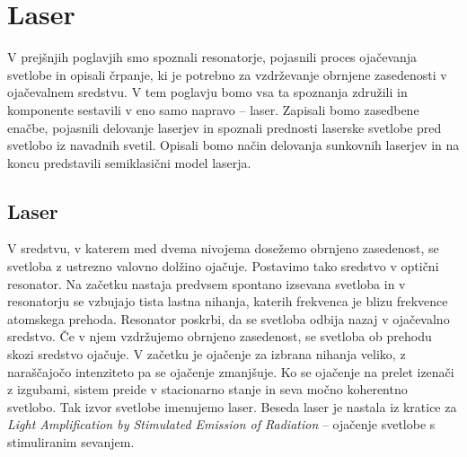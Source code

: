 \chapter{Laser}

V prejšnjih poglavjih smo spoznali resonatorje, pojasnili proces ojačevanja svetlobe in 
opisali črpanje, ki je potrebno za vzdrževanje obrnjene zasedenosti v ojačevalnem sredstvu. 
V tem poglavju bomo vsa ta
spoznanja združili in komponente sestavili v eno samo napravo -- laser. Zapisali
bomo zasedbene enačbe, pojasnili delovanje laserjev in spoznali prednosti 
laserske svetlobe pred svetlobo iz navadnih svetil. Opisali bomo način delovanja 
sunkovnih laserjev in na koncu predstavili semiklasični model laserja. 

\section{Laser}
V sredstvu, v katerem med dvema nivojema dosežemo obrnjeno 
zasedenost, se svetloba z ustrezno valovno dolžino ojačuje. 
Postavimo tako sredstvo v optični resonator.  
Na začetku nastaja predvsem spontano izsevana svetloba in 
v resonatorju se vzbujajo tista lastna nihanja, katerih frekvenca je blizu frekvence
atomskega prehoda. Resonator poskrbi, da se svetloba odbija nazaj v ojačevalno 
sredstvo. Če v njem vzdržujemo obrnjeno zasedenost, se svetloba ob prehodu skozi 
sredstvo ojačuje.
V začetku je ojačenje za
izbrana nihanja veliko, z naraščajočo intenziteto pa se ojačenje zmanjšuje.
Ko se ojačenje na prelet izenači z izgubami, sistem preide v stacionarno stanje in 
seva močno koherentno svetlobo. Tak
izvor svetlobe imenujemo laser. Beseda laser je nastala iz kratice za {\it Light
Amplification by Stimulated Emission of Radiation} --  ojačenje svetlobe s
stimuliranim sevanjem.

